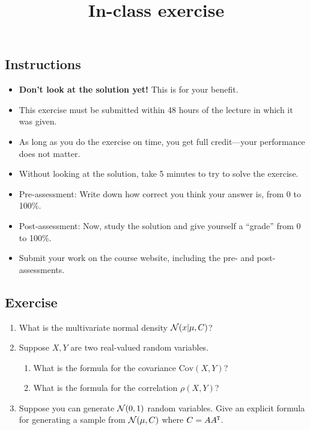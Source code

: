 \documentclass[12pt]{article}
\title{In-class exercise}
\author{}
\date{}
\begin{document}
\maketitle

\subsection*{Instructions}
\begin{itemize}
\item \textbf{Don't look at the solution yet!} This is for your benefit.
\item This exercise must be submitted within 48 hours of the lecture in which it was given. 
\item As long as you do the exercise on time, you get full credit---your performance does not matter.
\item Without looking at the solution, take 5 minutes to try to solve the exercise.
\item Pre-assessment: Write down how correct you think your answer is, from 0 to 100\%.
\item Post-assessment: Now, study the solution and give yourself a ``grade'' from 0 to 100\%.
\item Submit your work on the course website, including the pre- and post- assessments.
\end{itemize}

\subsection*{Exercise}
\begin{enumerate}
    \item What is the multivariate normal density $\mathcal{N}(x|\mu,C)$?
    \item Suppose $X,Y$ are two real-valued random variables.
    \begin{enumerate}
        \item What is the formula for the covariance $\mathrm{Cov}(X,Y)$?
        \item What is the formula for the correlation $\rho(X,Y)$?
    \end{enumerate}
    \item Suppose you can generate $\mathcal{N}(0,1)$ random variables. Give an explicit formula for generating a sample from $\mathcal{N}(\mu,C)$ where $C=A A^{\mathtt{T}}$.
\end{enumerate}
\end{document}
